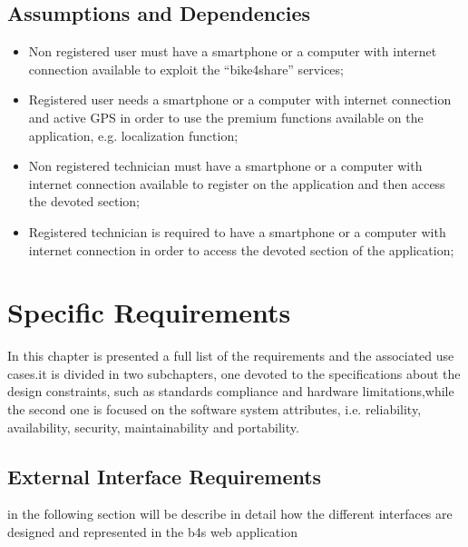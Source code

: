 \documentclass{article}
\begin{document}
\subsection{Assumptions and Dependencies}
\begin{itemize}
    \item Non registered user must have a smartphone or a computer with internet connection available to exploit the “bike4share” services;
    \item Registered user needs a smartphone or a computer with internet connection and active GPS in order to use the premium functions available on the application, e.g. localization function;
    \item Non registered technician must have a smartphone or a computer with internet connection available to register on the application and then access the devoted section;
    \item Registered technician is required to have a smartphone or a computer with internet connection in order to access the devoted section of the application;
\end{itemize}

\section{Specific Requirements}
In this chapter is presented a full list of the requirements and the associated use cases.it is divided in two subchapters, one devoted to the specifications about the design constraints, such as standards compliance and hardware limitations,while the second one is focused on the software system attributes, i.e. reliability, availability, security, maintainability and portability.

\subsection{External Interface Requirements}
in the following section will be describe in detail how the different interfaces are designed and represented in the b4s web application
\end{document}

